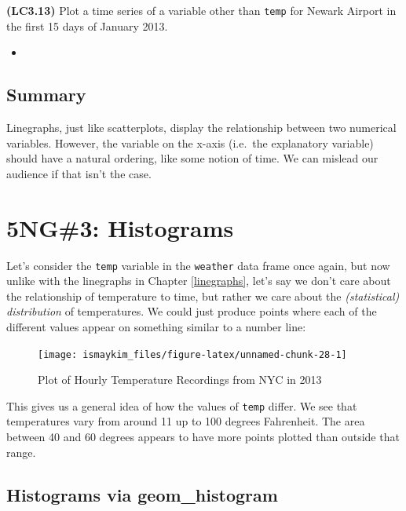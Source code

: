\documentclass[12pt,]{krantz}
\newenvironment{rmdblock}[1]
  {\begin{shaded*}
  \begin{itemize}
  \renewcommand{\labelitemi}{
    \raisebox{-.7\height}[0pt][0pt]{
    }
  }
  \item
  }
  {
  \end{itemize}
  \end{shaded*}
  }
\newenvironment{learncheck}
  {\begin{rmdblock}{warning}}
  {\end{rmdblock}}
\theoremstyle{definition}
\theoremstyle{definition}
\theoremstyle{definition}
\theoremstyle{remark}
\begin{document}
\textbf{(LC3.13)} Plot a time series of a variable other than
\texttt{temp} for Newark Airport in the first 15 days of January 2013.

\begin{learncheck}

\end{learncheck}

\subsection{Summary}\label{summary-1}

Linegraphs, just like scatterplots, display the relationship between two
numerical variables. However, the variable on the x-axis (i.e.~the
explanatory variable) should have a natural ordering, like some notion
of time. We can mislead our audience if that isn't the case.

\section{5NG\#3: Histograms}\label{histograms}

Let's consider the \texttt{temp} variable in the \texttt{weather} data
frame once again, but now unlike with the linegraphs in Chapter
\ref{linegraphs}, let's say we don't care about the relationship of
temperature to time, but rather we care about the \emph{(statistical)
distribution} of temperatures. We could just produce points where each
of the different values appear on something similar to a number line:

\begin{figure}

{\centering \texttt{[image: ismaykim\_files/figure-latex/unnamed-chunk-28-1]} 

}

\caption{Plot of Hourly Temperature Recordings from NYC in 2013}\label{fig:unnamed-chunk-28}
\end{figure}

This gives us a general idea of how the values of \texttt{temp} differ.
We see that temperatures vary from around 11 up to 100 degrees
Fahrenheit. The area between 40 and 60 degrees appears to have more
points plotted than outside that range.

\subsection{Histograms via geom\_histogram}\label{geomhistogram}
\end{document}
